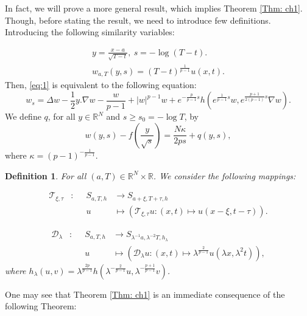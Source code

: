\documentclass[11pt,a4paper]{article}
\newcommand{\1}{\mathbbm{1}}
\numberwithin{equation}{section}
\newcommand{\numberset}{\mathbb}
\newcommand{\R}{\numberset{R}}
\newtheorem{defn}[lemma]{Definition}
\theoremstyle{remark}
\begin{document}
In fact, we will prove a more general result, which implies Theorem \ref{Thm: ch1}. Though, before stating the result, we need to introduce few definitions. Introducing the following similarity variables:

\begin{equation}\label{cv}
\begin{split}
y=\frac{x-a}{\sqrt{T-t}},\ s=-\log(T-t).\\
w_{a,T}(y,s)=(T-t)^{\frac{1}{p-1}}u(x,t).
\end{split}
\end{equation}
Then, \eqref{eq:1} is equivalent to the following equation:
\begin{equation}\label{eq1:cv}
w_s=\Delta w-\frac{1}{2}y.\nabla w-\frac{w}{p-1}+|w|^{p-1}w+e^{-\frac{p}{p-1} s}h(e^{\frac{1}{p-1} s}w,e^{\frac{p+1}{2(p-1)}s}\nabla w).
\end{equation}
We define $q$, for all $y\in \R^N$ and $s\geq s_0=-\log T$, by
\begin{equation}\label{equality w and q}
w(y,s)-f\left(\frac{y}{\sqrt{s}}\right)=\frac{N\kappa}{2ps}+q(y,s),
\end{equation}
where $\kappa=(p-1)^{-\frac{1}{p-1}}$.


\begin{defn}\label{Def S D}
For all $(a,T)\in \R^N\times \R$. We consider the following mappings:


\begin{equation*}
\begin{aligned}
\mathcal{T}_{\xi,\tau} & : & S_{a,T,h} & \rightarrow  S_{a+\xi,T+\tau,h}\\
& \quad & u & \mapsto  (\mathcal{T}_{\xi,\tau}u:(x,t)\mapsto u(x-\xi,t-\tau)).
\end{aligned}
\end{equation*}

\begin{equation*}
\begin{aligned}
\mathcal{D}_{\lambda} & : & S_{a,T,h} & \rightarrow  S_{\lambda^{-1}a,\lambda^{-2}T,h_\lambda}\\
& \quad & u & \mapsto  (\mathcal{D}_{\lambda}u:(x,t)\mapsto \lambda^{\frac{2}{p-1}} u(\lambda x,\lambda^2 t)),
\end{aligned}
\end{equation*}
where $h_\lambda(u,v)=\lambda^{\frac{2p}{p-1}}h(\lambda^{-\frac{2}{p-1}}u,\lambda^{-\frac{p+1}{p-1}}v)$.
\end{defn}


One may see that Theorem \ref{Thm: ch1} is an immediate consequence of the following Theorem:
\medskip
\end{document}

